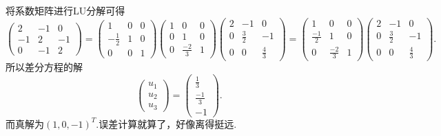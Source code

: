 ﻿\documentclass{book} \usepackage{exsheets} \usepackage{xeCJK}
\begin{document}
\begin{solution}
将系数矩阵进行LU分解可得
$$
\begin{pmatrix}
  2&-1&0\\
-1&2&-1\\
0&-1&2
\end{pmatrix}=
\begin{pmatrix}
  1&0&0\\
-\frac{1}{2}&1&0\\
0&0&1
\end{pmatrix}
\begin{pmatrix}
  1&0&0\\
0&1&0\\
0&\frac{-2}{3}&1
\end{pmatrix}
\begin{pmatrix}
  2&-1&0\\
0&\frac{3}{2}&-1\\
0&0&\frac{4}{3}
\end{pmatrix}=
\begin{pmatrix}
  1&0&0\\
\frac{-1}{2}&1&0\\
0&\frac{-2}{3}&1
\end{pmatrix}
\begin{pmatrix}
  2&-1&0\\
0&\frac{3}{2}&-1\\
0&0&\frac{4}{3}
\end{pmatrix}.
$$
所以差分方程的解
$$
\begin{pmatrix}
  u_1\\
u_2\\
u_3
\end{pmatrix}=
\begin{pmatrix}
  \frac{1}{3}\\
\frac{-1}{3}\\
-1
\end{pmatrix}.
$$而真解为$(1,0,-1)^{T}$.误差计算就算了，好像离得挺远.
\end{solution}
\end{document}
